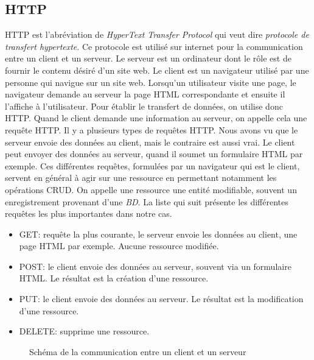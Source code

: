 \documentclass[a4paper,10pt,twoside]{sphinxmanual}
\begin{document}
\subsection{HTTP}
\label{restless:http}
HTTP est l'abréviation de \emph{HyperText Transfer Protocol} qui veut dire \emph{protocole de transfert hypertexte}. Ce protocole est utilisé sur internet pour la communication entre un client et un serveur. Le serveur est un ordinateur dont le rôle est de fournir le contenu désiré d'un site web. Le client est un navigateur utilisé par une personne qui navigue sur un site web. Lorsqu'un utilisateur visite une page, le navigateur demande au serveur la page HTML correspondante et ensuite il l'affiche à l'utilisateur. Pour établir le transfert de données, on utilise donc HTTP. Quand le client demande une information au serveur, on appelle cela une requête HTTP. Il y a plusieurs types de requêtes HTTP. Nous avons vu que le serveur envoie des données au client, mais le contraire est aussi vrai. Le client peut envoyer des données au serveur, quand il soumet un formulaire HTML par exemple. Ces différentes requêtes, formulées par un navigateur qui est le client, servent en général à agir sur une ressource en permettant notamment les opérations CRUD. On appelle une ressource une entité modifiable, souvent un enregistrement provenant d'une \emph{BD}. La liste qui suit présente les différentes requêtes les plus importantes dans notre cas.
\begin{itemize}
\item {} 
GET: requête la plus courante, le serveur envoie les données au client, une page HTML par exemple. Aucune ressource modifiée.

\item {} 
POST: le client envoie des données au serveur, souvent via un formulaire HTML. Le résultat est la création d'une ressource.

\item {} 
PUT: le client envoie des données au serveur. Le résultat est la modification d'une ressource.

\item {} 
DELETE: supprime une ressource.

\end{itemize}
\begin{figure}[htbp]
\centering
\capstart

\caption{Schéma de la communication entre un client et un serveur}\end{figure}
\end{document}
